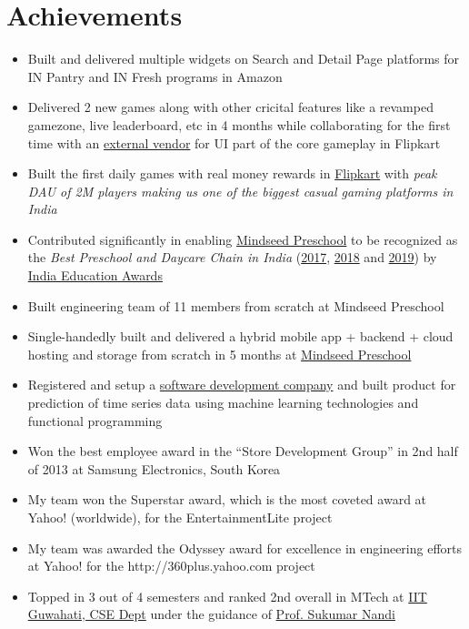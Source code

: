 \documentclass[11pt,a4paper,sans]{moderncv} %
\newcommand\Colorhref[3][blue]{\href{#2}{\small\color{#1}#3}}
\begin{document}
\section{Achievements}
\begin{itemize}
\item Built and delivered multiple widgets on Search and Detail Page platforms for IN Pantry and IN Fresh programs in Amazon
\item Delivered 2 new games along with other cricital features like a revamped gamezone, live leaderboard, etc in 4 months while collaborating for the first time with an \Colorhref{https://www.juegostudio.com/}{external vendor} for UI part of the core gameplay in Flipkart
\item Built the first daily games with real money rewards in \Colorhref{https://www.flipkart.com}{Flipkart} with \textit{peak DAU of 2M players making us one of the biggest casual gaming platforms in India}
\item Contributed significantly in enabling \Colorhref{https://blog.mindseed.in}{Mindseed Preschool} to be recognized as the \textit{Best Preschool and Daycare Chain in India} (\Colorhref{http://epaperbeta.timesofindia.com/Article.aspx?eid=31804&articlexml=City-preschool-wins-top-honours-26022017105028}{2017}, \Colorhref{https://www.businesswireindia.com/actress-soha-ali-khan-felicitates-achievers-at-india-education-awards-2018-organised-by-blindwink-57760.html}{2018} and  \Colorhref{https://www.theindianwire.com/education/india-education-awards-2019-organised-blindwink-18th-aug-soha-ali-khan-presents-award-162277/}{2019}) by \Colorhref{https://indiaeducationawards.com/}{India Education Awards}
\item Built engineering team of 11 members from scratch at Mindseed Preschool
\item Single-handedly built and delivered a hybrid mobile app + backend + cloud hosting and storage from scratch in 5 months at \Colorhref{https://blog.mindseed.in}{Mindseed Preschool}
\item Registered and setup a \Colorhref{https://www.zaubacorp.com/company/GRYFFIN-SOFTWARE-DEVELOPMENT-LLP/AAC-9108}{software development company} and built product for prediction of time series data using machine learning technologies and functional programming
\item Won the best employee award in the ``Store Development Group'' in 2nd half of 2013 at Samsung Electronics, South Korea
\item My team won the Superstar award, which is the most coveted award at Yahoo! (worldwide), for the EntertainmentLite project
\item My team was awarded the Odyssey award for excellence in engineering efforts at Yahoo! for the http://360plus.yahoo.com project
\item Topped in 3 out of 4 semesters and ranked 2nd overall in MTech at \Colorhref{https://www.iitg.ac.in/cse/}{IIT Guwahati, CSE Dept} under the guidance of \Colorhref{https://www.iitg.ac.in/sukumar/consultancy.html}{Prof. Sukumar Nandi}
\end{itemize}
\end{document}

